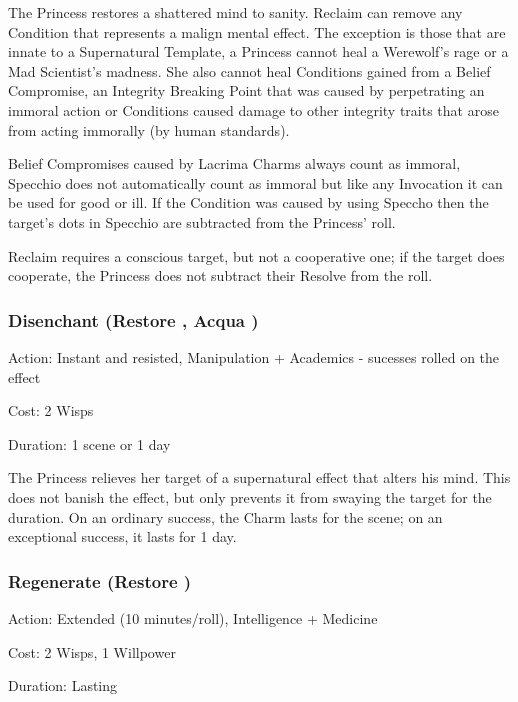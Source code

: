 \noindent The Princess restores a shattered mind to sanity. Reclaim can remove any Condition that represents a malign mental effect. The exception is those that are innate to a Supernatural Template, a Princess cannot heal a Werewolf's rage or a Mad Scientist's madness. She also cannot heal Conditions gained from a Belief Compromise, an Integrity Breaking Point that was caused by perpetrating an immoral action or Conditions caused damage to other integrity traits that arose from acting immorally (by human standards). 

Belief Compromises caused by Lacrima Charms always count as immoral, Specchio does not automatically count as immoral but like any Invocation it can be used for good or ill. If the Condition was caused by using Speccho then the target's dots in Specchio are subtracted from the Princess' roll.

Reclaim requires a conscious target, but not a cooperative one; if the target does cooperate, the Princess does not subtract their Resolve from the roll.

\subsubsection*{Disenchant (Restore \textbullet\textbullet\textbullet\textbullet, Acqua \textbullet\textbullet\textbullet\textbullet)}

\noindent Action: Instant and resisted, Manipulation + Academics - sucesses rolled on the effect

\noindent Cost: 2 Wisps

\noindent Duration: 1 scene or 1 day

The Princess relieves her target of a supernatural effect that alters his mind. This does not banish the effect, but only prevents it from swaying the target for the duration. On an ordinary success, the Charm lasts for the scene; on an exceptional success, it lasts for 1 day.

\subsubsection*{Regenerate (Restore \textbullet\textbullet\textbullet\textbullet)}

\noindent Action: Extended (10 minutes/roll), Intelligence  + Medicine

\noindent Cost: 2 Wisps, 1 Willpower

\noindent Duration: Lasting \\

